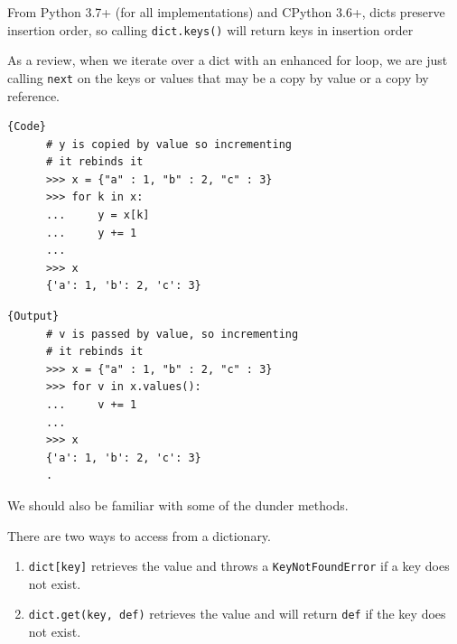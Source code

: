   \begin{theorem}
    \label{thm:dicts-preserve-insertion-order}
    From Python 3.7+ (for all implementations) and CPython 3.6+, dicts preserve insertion order, so calling \texttt{dict.keys()} will return keys in insertion order
  \end{theorem}

  \begin{example}
    \label{ex:back-to-references}
    As a review, when we iterate over a dict with an enhanced for loop, we are just calling \texttt{next} on the keys or values that may be a copy by value or a copy by reference. 

    \noindent\begin{minipage}{.5\textwidth}
    \begin{lstlisting}[]{Code}
      # y is copied by value so incrementing 
      # it rebinds it
      >>> x = {"a" : 1, "b" : 2, "c" : 3}
      >>> for k in x: 
      ...     y = x[k]
      ...     y += 1
      ... 
      >>> x
      {'a': 1, 'b': 2, 'c': 3} 
    \end{lstlisting}
    \end{minipage}
    \hfill
    \begin{minipage}{.49\textwidth}
    \begin{lstlisting}[]{Output}
      # v is passed by value, so incrementing 
      # it rebinds it
      >>> x = {"a" : 1, "b" : 2, "c" : 3}
      >>> for v in x.values(): 
      ...     v += 1
      ... 
      >>> x
      {'a': 1, 'b': 2, 'c': 3} 
      .
    \end{lstlisting}
    \end{minipage}
  \end{example}


  We should also be familiar with some of the dunder methods. 

  \begin{definition}[Get]
    \label{def:get}
    There are two ways to access from a dictionary. 
    \begin{enumerate}
      \item \texttt{dict[key]} retrieves the value and throws a \texttt{KeyNotFoundError} if a key does not exist. 
      \item \texttt{dict.get(key, def)} retrieves the value and will return \texttt{def} if the key does not exist. 
    \end{enumerate}
  \end{definition}
  
